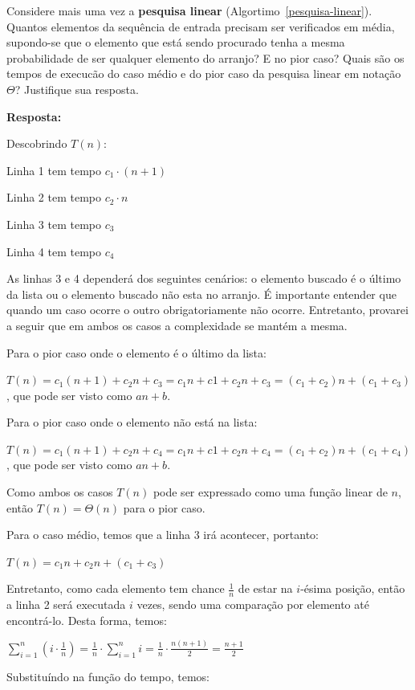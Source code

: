 \documentclass{article}
\begin{document}
    Considere mais uma vez a \textbf{pesquisa linear} (Algortimo~\ref{pesquisa-linear}). Quantos elementos da sequência de entrada precisam ser verificados em média, supondo-se que o elemento que está sendo procurado tenha a mesma probabilidade de ser qualquer elemento do arranjo? E no pior caso? Quais são os tempos de execucão do caso médio e do pior caso da pesquisa linear em notação $\Theta$? Justifique sua resposta.

    \textbf{Resposta:}

    Descobrindo $T(n)$:

    Linha 1 tem tempo $c_1 \cdot (n+1)$

    Linha 2 tem tempo $c_2 \cdot n$

    Linha 3 tem tempo $c_3$

    Linha 4 tem tempo $c_4$

    As linhas 3 e 4 dependerá dos seguintes cenários: o elemento buscado é o último da lista ou o elemento buscado não esta no arranjo. É importante entender que quando um caso ocorre o outro obrigatoriamente não ocorre. Entretanto, provarei a seguir que em ambos os casos a complexidade se mantém a mesma.

    Para o pior caso onde o elemento é o último da lista:

    $T(n) = c_1 (n+1) + c_2 n + c_3 = c_1 n + c1 + c_2 n + c_3 = (c_1+c_2)n + (c_1 + c_3)$, que pode ser visto como $an + b$.

    Para o pior caso onde o elemento não está na lista:

    $T(n) = c_1 (n+1) + c_2 n + c_4 = c_1 n + c1 + c_2 n + c_4 = (c_1+c_2)n + (c_1 + c_4)$, que pode ser visto como $an + b$.

    Como ambos os casos $T(n)$ pode ser expressado como uma função linear de $n$, então $T(n) = \Theta(n)$ para o pior caso.

    Para o caso médio, temos que a linha 3 irá acontecer, portanto:

    $T(n) = c_1n + c_2n + (c_1 + c_3)$

    Entretanto, como cada elemento tem chance $\frac{1}{n}$ de estar na $i$-ésima posição, então a linha 2 será executada $i$ vezes, sendo uma comparação por elemento até encontrá-lo. Desta forma, temos:

    $\sum_{i = 1}^{n}({i \cdot \frac{1}{n}}) = \frac{1}{n} \cdot \sum_{i = 1}^{n}{i} = \frac{1}{n} \cdot \frac{n(n+1)}{2} = \frac{n+1}{2}$

    Substituíndo na função do tempo, temos:
\end{document}
